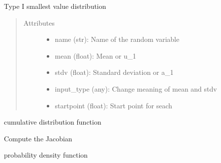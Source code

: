 \documentclass[letterpaper,10pt,english]{sphinxmanual}
\begin{document}
\begin{fulllineitems}
Type I smallest value distribution
\begin{quote}\begin{description}
\item[{Attributes }] \leavevmode\begin{itemize}
\item {} 
name (str):   Name of the random variable

\item {} 
mean (float): Mean or u\_1

\item {} 
stdv (float): Standard deviation or a\_1

\item {} 
input\_type (any): Change meaning of mean and stdv

\item {} 
startpoint (float): Start point for seach

\end{itemize}

\end{description}\end{quote}


\begin{fulllineitems}
cumulative distribution function

\end{fulllineitems}



\begin{fulllineitems}
Compute the Jacobian

\end{fulllineitems}



\begin{fulllineitems}
probability density function


\end{fulllineitems}
\end{fulllineitems}
\end{document}
